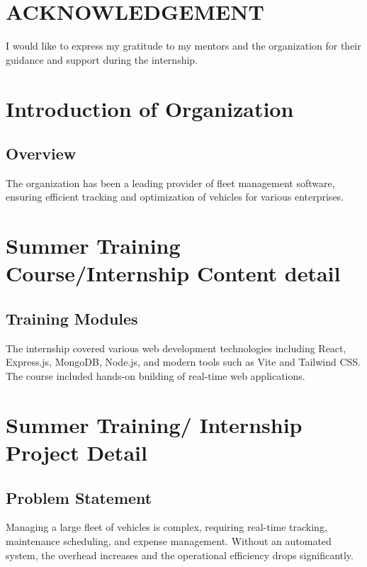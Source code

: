 \documentclass[12pt, a4paper]{report}
\begin{document}
\clearpage

\chapter*{ACKNOWLEDGEMENT}
I would like to express my gratitude to my mentors and the organization for their guidance and support during the internship.

\clearpage

\tableofcontents
\clearpage

\setcounter{page}{1}
\pagestyle{plain}

\chapter{Introduction of Organization}
\thispagestyle{empty} %

\section{Overview}
The organization has been a leading provider of fleet management software, ensuring efficient tracking and optimization of vehicles for various enterprises.

\chapter{Summer Training Course/Internship Content detail}
\section{Training Modules}
The internship covered various web development technologies including React, Express.js, MongoDB, Node.js, and modern tools such as Vite and Tailwind CSS. The course included hands-on building of real-time web applications.

\chapter{Summer Training/ Internship Project Detail}

\section{Problem Statement}
Managing a large fleet of vehicles is complex, requiring real-time tracking, maintenance scheduling, and expense management. Without an automated system, the overhead increases and the operational efficiency drops significantly.
\end{document}
